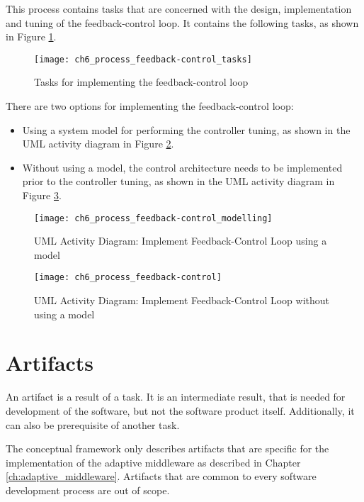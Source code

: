 This process contains tasks that are concerned with the design, implementation and tuning of the feedback-control loop. It contains the following tasks, as shown in Figure \ref{fig:ch6_tasks_feedback_control}.

\begin{figure}[htpb] \centering 
	\texttt{[image: ch6\_process\_feedback-control\_tasks]} 
	\caption{Tasks for implementing the feedback-control loop} 
	\label{fig:ch6_tasks_feedback_control} 
\end{figure}

There are two options for implementing the feedback-control loop:
\begin{itemize}
	\item Using a system model for performing the controller tuning, as shown in the \ac{UML} activity diagram in Figure \ref{fig:ch6_process_feedback-control_modelling}.
	\item Without using a model, the control architecture needs to be implemented prior to the controller tuning, as shown in the \ac{UML} activity diagram in Figure \ref{fig:ch6_process_feedback-control}.
\end{itemize}

\begin{figure}[htpb] 
	\centering 
	\texttt{[image: ch6\_process\_feedback-control\_modelling]}
	\caption{\ac{UML} Activity Diagram: Implement Feedback-Control Loop using a model}
	\label{fig:ch6_process_feedback-control_modelling}
\end{figure}

\begin{figure}[htpb] 
	\centering 
	\texttt{[image: ch6\_process\_feedback-control]}
	\caption{\ac{UML} Activity Diagram: Implement Feedback-Control Loop without using a model}
	\label{fig:ch6_process_feedback-control}
\end{figure}

\section{Artifacts}\label{sec:ch6_artifacts}

An artifact is a result of a task. It is an intermediate result, that is needed for development of the software, but not the software product itself. Additionally, it can also be prerequisite of another task. 

The conceptual framework only describes artifacts that are specific for the implementation of the adaptive middleware as described in Chapter \ref{ch:adaptive_middleware}. Artifacts that are common to every software development process are out of scope.


